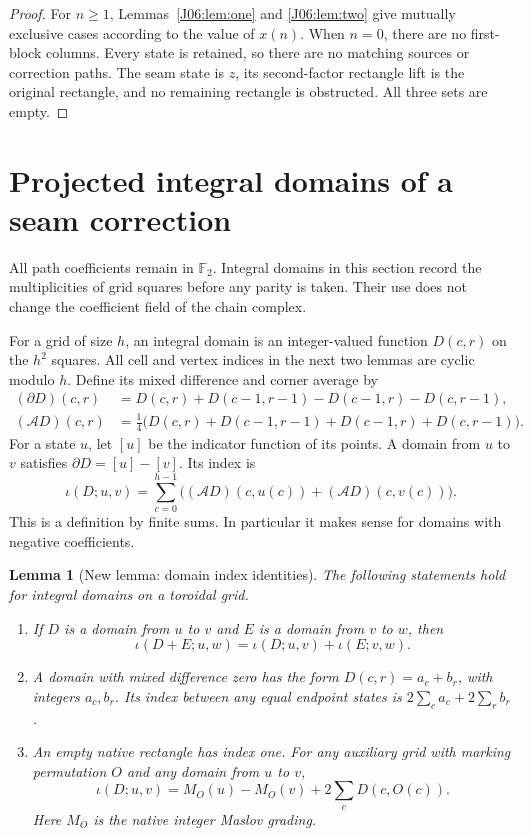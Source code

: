\documentclass[11pt,oneside]{report}
\newtheorem{lemma}[theorem]{Lemma}
\theoremstyle{definition}
\numberwithin{equation}{section}
\begin{document}
\begin{proof}
For $n\ge1$, Lemmas~\ref{J06:lem:one} and \ref{J06:lem:two} give mutually
exclusive cases according to the value of $x(n)$.
When $n=0$, there are no first-block columns. Every state is retained,
so there are no matching sources or correction paths. The seam state
is $z$, its second-factor rectangle lift is the original rectangle,
and no remaining rectangle is obstructed. All three sets are empty.
\end{proof}

\section{Projected integral domains of a seam correction}

All path coefficients remain in $\mathbb F_2$. Integral domains in this
section record the multiplicities of grid squares before any parity is
taken. Their use does not change the coefficient field of the chain
complex.

For a grid of size $h$, an integral domain is an integer-valued function
$D(c,r)$ on the $h^2$ squares. All cell and vertex indices in the next
two lemmas are cyclic modulo $h$. Define its mixed difference and corner
average by
\[
 \begin{split}
 (\partial D)(c,r)
 &=D(c,r)+D(c-1,r-1)-D(c-1,r)-D(c,r-1),\\
 (\mathcal A D)(c,r)
 &=\tfrac14\bigl(D(c,r)+D(c-1,r-1)+D(c-1,r)+D(c,r-1)\bigr).
 \end{split}
\]
For a state $u$, let $[u]$ be the indicator function of its points.
A domain from $u$ to $v$ satisfies $\partial D=[u]-[v]$. Its index is
\[
 \iota(D;u,v)=\sum_{c=0}^{h-1}
 \bigl((\mathcal A D)(c,u(c))+(\mathcal A D)(c,v(c))\bigr).
\]
This is a definition by finite sums. In particular it makes sense for
domains with negative coefficients.

\begin{lemma}[New lemma: domain index identities]
\label{J06:lem:seam-domain-index}
The following statements hold for integral domains on a toroidal grid.
\begin{enumerate}
\item If $D$ is a domain from $u$ to $v$ and $E$ is a domain from
$v$ to $w$, then
\[
 \iota(D+E;u,w)=\iota(D;u,v)+\iota(E;v,w).
\]
\item A domain with mixed difference zero has the form
$D(c,r)=a_c+b_r$, with integers $a_c,b_r$. Its index between any equal
endpoint states is $2\sum_c a_c+2\sum_r b_r$.
\item An empty native rectangle has index one. For any auxiliary
grid with marking permutation $O$ and any domain from $u$ to $v$,
\begin{equation}\label{J06:eq:seam-domain-maslov}
 \iota(D;u,v)=M_O(u)-M_O(v)+2\sum_c D(c,O(c)).
\end{equation}
Here $M_O$ is the native integer Maslov grading.
\end{enumerate}
\end{lemma}
\end{document}
